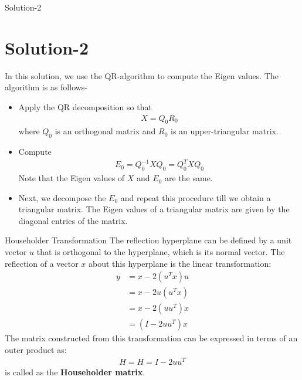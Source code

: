 \begin{frame}{Solution-2}
    \section{Solution-2}
    In this solution, we use the QR-algorithm to compute the Eigen values. The algorithm is as follows-
    \begin{itemize}
        \item Apply the QR decomposition so that
                \begin{align*}
                    X = Q_0R_0
                \end{align*}
                where $Q_0$ is an orthogonal matrix and $R_0$ is an upper-triangular matrix.
        \item Compute 
              \begin{align*}
                    E_0 = Q_0^{-1} X Q_0 = Q_0 ^ T X Q_0
                \end{align*} 
                Note that the Eigen values of $X$ and $E_0$ are the same.
        \item Next, we decompose the $E_0$ and repeat this procedure till we obtain a triangular matrix. The Eigen values of a triangular matrix are given by the diagonal entries of the matrix.
    \end{itemize}
\end{frame}

\begin{frame}{Householder Transformation}
    The reflection hyperplane can be defined by a unit vector $u$ that is orthogonal to the hyperplane, which is its normal vector. The reflection of a vector $x$ about this hyperplane is the linear transformation:
    \begin{align*}
        y &= x - 2 (u^T x) u \\
        &= x - 2 u (u ^T x) \\
        &= x - 2 (u u ^T) x \\
        &= (I - 2 u u^T) x
    \end{align*}
    The matrix constructed from this transformation can be expressed in terms of an outer product as:
    \begin{align*}
        H = H=I-2 u u^{T}
    \end{align*}
    is called as the \textbf{Householder matrix}.
\end{frame}

